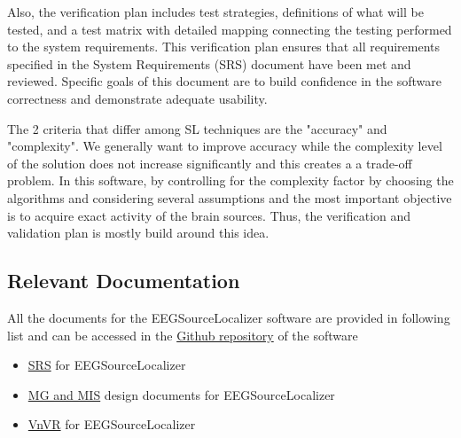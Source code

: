 \documentclass[12pt, titlepage]{article}
\renewcommand{\progname}{EEGSourceLocalizer}
\begin{document}
Also, the verification plan  includes test strategies, definitions of what will be tested, and a test matrix with detailed mapping connecting the testing performed to the system requirements. This verification plan ensures that all requirements specified in the System Requirements (SRS) document have been met and reviewed. Specific goals of this document are to build confidence in the software correctness and demonstrate adequate usability.

The 2 criteria that differ among SL techniques are the "accuracy" and "complexity". We generally want to improve accuracy while the complexity level of the solution does not increase significantly and this creates a a trade-off problem. In this software, by controlling for the complexity factor by choosing the algorithms and considering several assumptions and the most important objective is to acquire exact activity of the brain sources. Thus, the verification and validation plan is mostly build around this idea.


\subsection{Relevant Documentation}

All the documents for the \progname{} software are provided in following list and can be accessed in the \href{https://github.com/LeilaMousapour/Brain-Computer-Interface-}{Github repository} of the software
\begin{itemize} 
	\item \href{https://github.com/LeilaMousapour/Brain-Computer-Interface-/blob/master/docs/SRS/SRS.pdf}{SRS} for \progname{}
	\item \href{https://github.com/LeilaMousapour/Brain-Computer-Interface-/tree/master/docs/Design}{MG and MIS} design documents for \progname
	\item \href{https://github.com/LeilaMousapour/Brain-Computer-Interface-/tree/master/docs/VnVReport}{VnVR} for \progname{}
	
\end{itemize}
\end{document}
